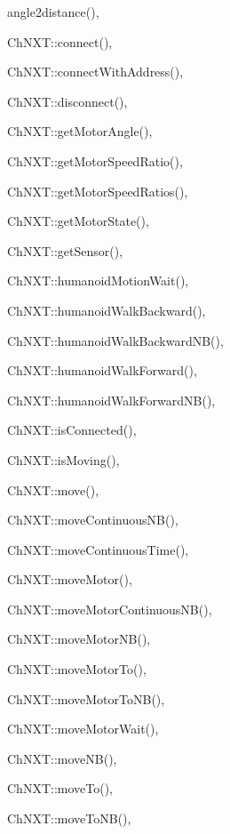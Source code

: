 \begin{theindex}

  \item angle2distance(), 

  \indexspace

  \item ChNXT::connect(), 
  \item ChNXT::connectWithAddress(), 
  \item ChNXT::disconnect(), 
  \item ChNXT::getMotorAngle(), 
  \item ChNXT::getMotorSpeedRatio(), 
  \item ChNXT::getMotorSpeedRatios(), 
  \item ChNXT::getMotorState(), 
  \item ChNXT::getSensor(), 
  \item ChNXT::humanoidMotionWait(), 
  \item ChNXT::humanoidWalkBackward(), 
  \item ChNXT::humanoidWalkBackwardNB(), 
  \item ChNXT::humanoidWalkForward(), 
  \item ChNXT::humanoidWalkForwardNB(), 
  \item ChNXT::isConnected(), 
  \item ChNXT::isMoving(), 
  \item ChNXT::move(), 
  \item ChNXT::moveContinuousNB(), 
  \item ChNXT::moveContinuousTime(), 
  \item ChNXT::moveMotor(), 
  \item ChNXT::moveMotorContinuousNB(), 
  \item ChNXT::moveMotorNB(), 
  \item ChNXT::moveMotorTo(), 
  \item ChNXT::moveMotorToNB(), 
  \item ChNXT::moveMotorWait(), 
  \item ChNXT::moveNB(), 
  \item ChNXT::moveTo(), 
  \item ChNXT::moveToNB(), 

\end{theindex}
